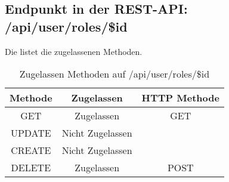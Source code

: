 \subsection{Endpunkt in der REST-API: /api/user/roles/\$id}
Die  listet die zugelassenen Methoden. 

\begin{table}[!htbp]
	\begin{tabular}{|c|c|c|}
		\hline
			\textbf{Methode} & \textbf{Zugelassen} & \textbf{HTTP Methode} \\ \hline
			GET & Zugelassen & GET \\ \hline
			UPDATE & Nicht Zugelassen & \\ \hline 
			CREATE & Nicht Zugelassen & \\ \hline 
			DELETE & Zugelassen & POST\\ \hline
	\end{tabular}

		\caption{Zugelassen Methoden auf /api/user/roles/\$id}
		\label{tab:end:rest:api:user:roles:id:meth}
\end{table}